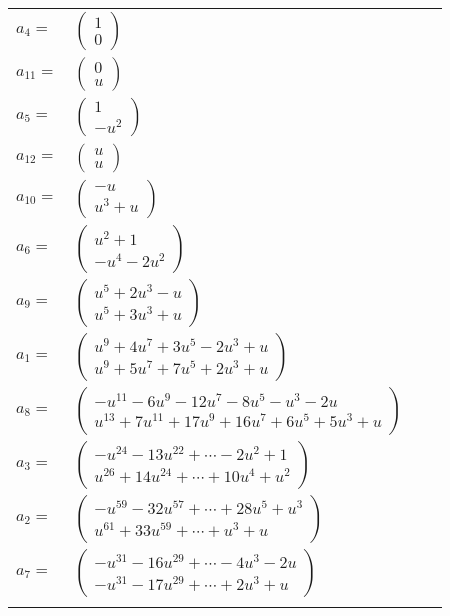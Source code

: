 \documentclass[1p]{elsarticle_modified}
\theoremstyle{definition}
\begin{document}
\begin{tabular}{m{7pt} m{180pt} m{7pt} m{180pt} }
\flushright $a_{4}=$&$\begin{pmatrix}1\\0\end{pmatrix}$ \\
\flushright $a_{11}=$&$\begin{pmatrix}0\\u\end{pmatrix}$ \\
\flushright $a_{5}=$&$\begin{pmatrix}1\\- u^2\end{pmatrix}$ \\
\flushright $a_{12}=$&$\begin{pmatrix}u\\u\end{pmatrix}$ \\
\flushright $a_{10}=$&$\begin{pmatrix}- u\\u^3+u\end{pmatrix}$ \\
\flushright $a_{6}=$&$\begin{pmatrix}u^2+1\\- u^4-2 u^2\end{pmatrix}$ \\
\flushright $a_{9}=$&$\begin{pmatrix}u^5+2 u^3- u\\u^5+3 u^3+u\end{pmatrix}$ \\
\flushright $a_{1}=$&$\begin{pmatrix}u^9+4 u^7+3 u^5-2 u^3+u\\u^9+5 u^7+7 u^5+2 u^3+u\end{pmatrix}$ \\
\flushright $a_{8}=$&$\begin{pmatrix}- u^{11}-6 u^9-12 u^7-8 u^5- u^3-2 u\\u^{13}+7 u^{11}+17 u^9+16 u^7+6 u^5+5 u^3+u\end{pmatrix}$ \\
\flushright $a_{3}=$&$\begin{pmatrix}- u^{24}-13 u^{22}+\cdots-2 u^2+1\\u^{26}+14 u^{24}+\cdots+10 u^4+u^2\end{pmatrix}$ \\
\flushright $a_{2}=$&$\begin{pmatrix}- u^{59}-32 u^{57}+\cdots+28 u^5+u^3\\u^{61}+33 u^{59}+\cdots+u^3+u\end{pmatrix}$ \\
\flushright $a_{7}=$&$\begin{pmatrix}- u^{31}-16 u^{29}+\cdots-4 u^3-2 u\\- u^{31}-17 u^{29}+\cdots+2 u^3+u\end{pmatrix}$\\&\end{tabular}
\end{document}
